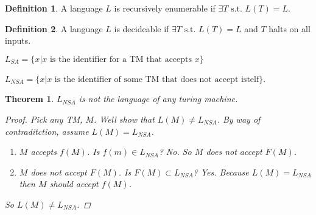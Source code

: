 \documentclass[12pt]{article}
\newtheorem{thm}{Theorem}
\theoremstyle{definition}
\newtheorem{defn}{Definition}
\begin{document}
\begin{defn}
	A language $L$ is recursively enumerable if $\exists T \text{ s.t. } L(T) =
	L$.
\end{defn}

\begin{defn}
	A language $L$ is decideable if $\exists T \text{ s.t. } L(T) =
	L$ and $T$ halts on all inputs.
\end{defn}

$L_{SA} = \{x|x \text{ is the identifier for a TM that accepts $x$}\}$

$L_{NSA} = \{x | x \text{ is the identifier of some TM that does not accept
istelf}\}$.

\begin{thm}
	$L_{NSA}$ is not the language of any turing machine.

	\begin{proof}

		Pick any TM, $M$. Well show that $L(M) \neq L_{NSA}$. By way of
		contraditction, assume $L(M) = L_{NSA}$.
		\begin{enumerate}
			\item $M$ accepts $f(M)$. Is $f(m) \in L_{NSA}$? No. So $M$ does not
				accept $F(M)$.
			\item $M$ does not accept $F(M)$. Is $F(M) \subset L_{NSA}$? Yes.
				Because $L(M) = L_{NSA}$ then $M$ should accept $f(M)$.
		\end{enumerate}

		So $L(M) \neq L_{NSA}$.

	\end{proof}
\end{thm}
\end{document}
